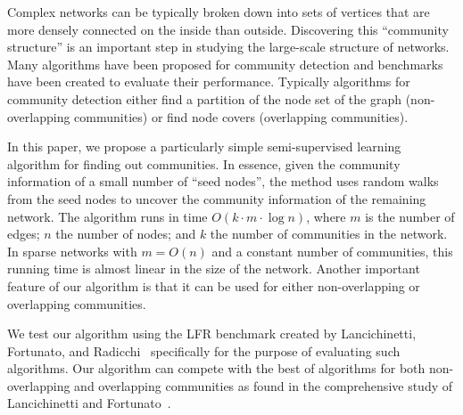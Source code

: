 Complex networks can be typically broken down into sets of vertices that are
more densely connected on the inside than outside. Discovering this ``community
structure'' is an important step in studying the large-scale structure of
networks. Many algorithms have been proposed for community detection and
benchmarks have been created to evaluate their performance. Typically algorithms
for community detection either find a partition of the node set of the graph 
(non-overlapping communities) or find node covers (overlapping communities). 

In this paper, we propose a particularly simple semi-supervised learning
algorithm for finding out communities. In essence, given the community
information of a small number of ``seed nodes'', the method uses random walks
from the seed nodes to uncover the community information of the remaining network.
The algorithm runs in time $O(k \cdot m \cdot \log n)$, where $m$ is the number
of edges; $n$ the number of nodes; and $k$ the number of communities in the
network.  In sparse networks with $m = O(n)$ and a constant number of
communities, this running time is almost linear in the size of the network.
Another important feature of our algorithm is that it can be used for either
non-overlapping or overlapping communities. 

We test our algorithm using the LFR benchmark created by Lancichinetti,
Fortunato, and Radicchi~\cite{LFR08} specifically for the purpose of evaluating
such algorithms. Our algorithm can compete with the best of algorithms for both
non-overlapping and overlapping communities as found in the comprehensive study
of Lancichinetti and Fortunato~\cite{LF09}.
